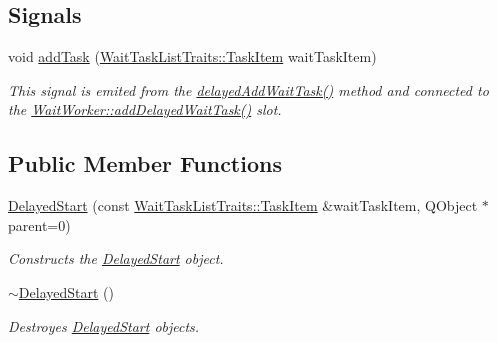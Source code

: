 \subsection*{Signals}
\begin{DoxyCompactItemize}
\item 
\hypertarget{class_delayed_start_ab12e84ab2900082373f556051f260c9c}{}void \hyperlink{class_delayed_start_ab12e84ab2900082373f556051f260c9c}{add\+Task} (\hyperlink{struct_wait_task_list_traits_1_1_task_item}{Wait\+Task\+List\+Traits\+::\+Task\+Item} wait\+Task\+Item)\label{class_delayed_start_ab12e84ab2900082373f556051f260c9c}

\begin{DoxyCompactList}\small\item\em This signal is emited from the \hyperlink{class_delayed_start_a579d849a61a9f20cb29bc18d5be7611a}{delayed\+Add\+Wait\+Task()} method and connected to the \hyperlink{class_wait_worker_a71dec4dbc5a123f20d0a5a7f707ed5a3}{Wait\+Worker\+::add\+Delayed\+Wait\+Task()} slot. \end{DoxyCompactList}\end{DoxyCompactItemize}
\subsection*{Public Member Functions}
\begin{DoxyCompactItemize}
\item 
\hyperlink{class_delayed_start_a68f9a781f7423106276e4a1f1e169fed}{Delayed\+Start} (const \hyperlink{struct_wait_task_list_traits_1_1_task_item}{Wait\+Task\+List\+Traits\+::\+Task\+Item} \&wait\+Task\+Item, Q\+Object $\ast$parent=0)
\begin{DoxyCompactList}\small\item\em Constructs the \hyperlink{class_delayed_start}{Delayed\+Start} object. \end{DoxyCompactList}\item 
\hypertarget{class_delayed_start_aa0e567f544ba762575a7ff045a9864ea}{}\hyperlink{class_delayed_start_aa0e567f544ba762575a7ff045a9864ea}{$\sim$\+Delayed\+Start} ()\label{class_delayed_start_aa0e567f544ba762575a7ff045a9864ea}

\begin{DoxyCompactList}\small\item\em Destroyes \hyperlink{class_delayed_start}{Delayed\+Start} objects. \end{DoxyCompactList}\end{DoxyCompactItemize}
